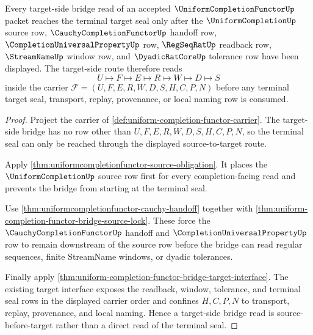 \begin{theorem}
\label{thm:uniform-completion-functor-target-source-order}
Every target-side bridge read of an accepted $\UniformCompletionFunctorUp$ packet reaches the terminal target seal only after the $\UniformCompletionUp$ source row, $\CauchyCompletionFunctorUp$ handoff row, $\CompletionUniversalPropertyUp$ row, $\RegSeqRatUp$ readback row, $\StreamNameUp$ window row, and $\DyadicRatCoreUp$ tolerance row have been displayed. The target-side route therefore reads
$$
U\longmapsto F\longmapsto E\longmapsto R\longmapsto W\longmapsto D\longmapsto S
$$
inside the carrier $\mathcal{F}=(U,F,E,R,W,D,S,H,C,P,N)$ before any terminal target seal, transport, replay, provenance, or local naming row is consumed.
\end{theorem}
\begin{proof}
Project the carrier of \autoref{def:uniform-completion-functor-carrier}. The target-side bridge has no row other than $U,F,E,R,W,D,S,H,C,P,N$, so the terminal seal can only be reached through the displayed source-to-target route.

Apply \autoref{thm:uniformcompletionfunctor-source-obligation}. It places the $\UniformCompletionUp$ source row first for every completion-facing read and prevents the bridge from starting at the terminal seal.

Use \autoref{thm:uniformcompletionfunctor-cauchy-handoff} together with \autoref{thm:uniform-completion-functor-bridge-source-lock}. These force the $\CauchyCompletionFunctorUp$ handoff and $\CompletionUniversalPropertyUp$ row to remain downstream of the source row before the bridge can read regular sequences, finite StreamName windows, or dyadic tolerances.

Finally apply \autoref{thm:uniform-completion-functor-bridge-target-interface}. The existing target interface exposes the readback, window, tolerance, and terminal seal rows in the displayed carrier order and confines $H,C,P,N$ to transport, replay, provenance, and local naming. Hence a target-side bridge read is source-before-target rather than a direct read of the terminal seal.
\end{proof}
